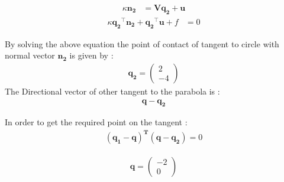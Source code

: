 \documentclass[journal,10pt,twocolumn]{article}
\let\vec\mathbf
\newcommand{\myvec}[1]{\ensuremath{\begin{pmatrix}#1\end{pmatrix}}}
\begin{document}
\begin{align}
\kappa \vec{n_2} &= \vec{V} \vec{q_2}+\vec{u}
\end{align}
\begin{align}
\kappa \vec{q_2}^{\top}\vec{n_2} +\vec{q_2}^{\top}\vec{u}+f&= 0
\end{align}










By solving the above equation the point of contact of tangent to circle with normal vector $\vec{n_2}$ is given by :
\begin{align}
\vec{q_2} = \myvec{2\\-4}
\end{align}
The Directional vector of other  tangent to the  parabola is :
\begin{align}
\vec{q}-\vec{q_2}
\end{align}


In order to get the  required point on the tangent :
\begin{align}
\vec{{{(q_1-q)}}^T}(\vec{q}-\vec{q_2})=0
\end{align}


\begin{align}
\vec{q}=\myvec{-2\\0}
\end{align}
\end{document}
